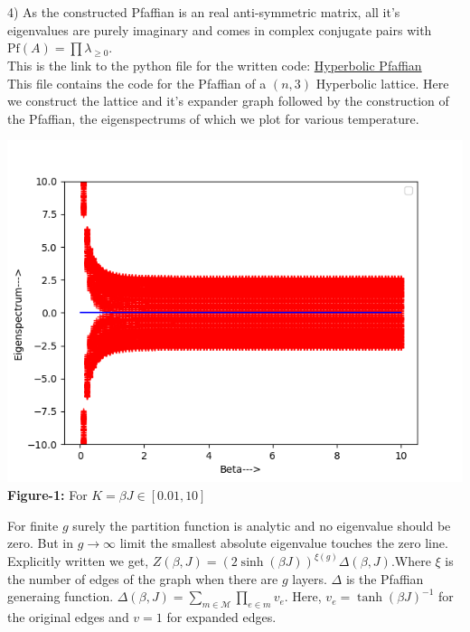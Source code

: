 \documentclass{article}
\begin{document}
     4) As the constructed Pfaffian is an real anti-symmetric matrix, all it's eigenvalues are purely imaginary and comes in complex conjugate pairs with $\text{Pf}(A)=\prod \lambda_{\geq 0}$. \\
     
     This is the link to the python file for the written code: \href{https://github.com/ad1729-math/DP-Files/blob/main/Hyperbolic%20Pfaffian.py}{Hyperbolic Pfaffian}\\
     
     This file contains the code for the Pfaffian of a $(n,3)$ Hyperbolic lattice. Here we construct the lattice and it's expander graph followed by the construction of the Pfaffian, the eigenspectrums of which we plot for various temperature. \\
     
     \begin{center}
     	\includegraphics[scale=0.5]{Hyperbolic lattice eigenspectrum.png}\\
     	\textbf{Figure-1:} For $K=\beta J \in [0.01,10]$\\
     \end{center}
     
     For finite $g$ surely the partition function is analytic and no eigenvalue should be zero. But in $g \to \infty$ limit the smallest absolute eigenvalue touches the zero line. Explicitly written we get, $Z(\beta, J)=(2\sinh(\beta J))^{\xi(g)}\Delta(\beta, J)$.Where $\xi$ is the number of edges of the graph when there are $g$ layers. $\Delta$ is the Pfaffian generaing function. $\Delta(\beta, J)=\sum_{m \in \mathcal{M}}\prod_{e \in m} v_e$. Here, $v_e=\tanh(\beta J)^{-1}$ for the original edges and $v=1$ for expanded edges.\\
     
\end{document}
